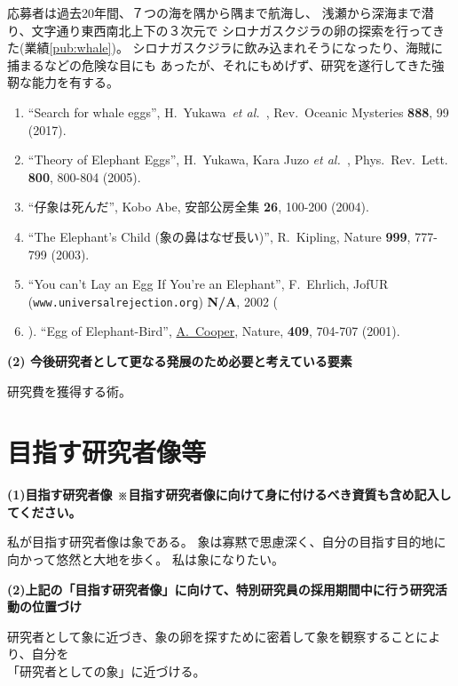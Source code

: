 \documentclass[11pt,a4j,dvipdfmx]{jarticle} 					%
\newcommand{\研究課題名}{象の卵}
\newcommand{\研究機関名}{逢坂大学}
\newcommand{\研究代表者氏名}{湯川秀樹}
\newcommand{\paper}[6]{%
	\item ``#1'', #2, #3 {\bf #4}, #5 (#6).			%
}
\newcommand{\etal}{\textit{et al.\ }}
\newcommand{\yukawa}{H.~Yukawa}					%
\newcommand{\prl}{Phys.\ Rev.\ Lett.\ }		%
\begin{document}
	応募者は過去20年間、７つの海を隅から隅まで航海し、
	浅瀬から深海まで潜り、文字通り東西南北上下の３次元で
	シロナガスクジラの卵の探索を行ってきた(業績\ref{pub:whale})。
	シロナガスクジラに飲み込まれそうになったり、海賊に捕まるなどの危険な目にも
	あったが、それにもめげず、研究を遂行してきた強靭な能力を有する。
	\begin{enumerate}
		\paper{Search for whale eggs}{\yukawa\ \etal}{Rev.\ Oceanic Mysteries}{888}{99}{2017}
			\label{pub:whale}
				
		\paper{Theory of Elephant Eggs}{\yukawa, Kara Juzo \etal}{\prl}{800}{800-804}{2005}
			\label{pub:theoegg}
				
		\paper{仔象は死んだ}{Kobo Abe}{安部公房全集}{26}{100-200}{2004}
		
		\paper{The Elephant's Child (象の鼻はなぜ長い)}{R.~Kipling}{Nature}{999}{777-799}{2003}

		\paper{You can't Lay an Egg If You're an Elephant}{F.~Ehrlich}
			{JofUR\\({\tt www.universalrejection.org})}{{\bf N/A}}{2002}
		
		\item ``Egg of Elephant-Bird'', 
				\underline{A.~Cooper},
				Nature, {\bf 409}, 704-707 (2001).	%
	\end{enumerate}
\vspace{5mm}
\noindent
\textbf{(2) 今後研究者として更なる発展のため必要と考えている要素}

研究費を獲得する術。





\section{目指す研究者像等}

\noindent
\textbf{(1)目指す研究者像 {\scriptsize ※目指す研究者像に向けて身に付けるべき資質も含め記入してください。}}

私が目指す研究者像は象である。
象は寡黙で思慮深く、自分の目指す目的地に向かって悠然と大地を歩く。
私は象になりたい。

\vspace{5mm}
\noindent
\textbf{(2)上記の「目指す研究者像」に向けて、特別研究員の採用期間中に行う研究活動の位置づけ}

研究者として象に近づき、象の卵を探すために密着して象を観察することにより、自分を\\
「研究者としての象」に近づける。



\end{document}
